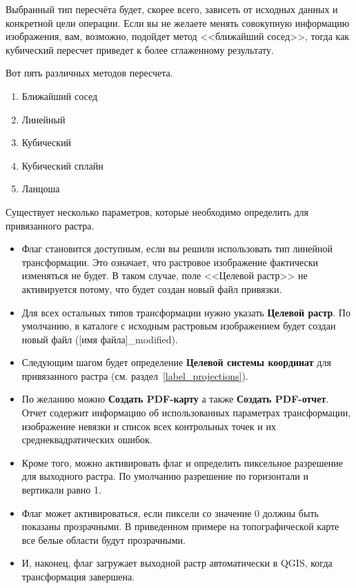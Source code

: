 Выбранный тип пересчёта будет, скорее всего, зависеть от исходных данных
и конкретной цели операции. Если вы не желаете менять совокупную
информацию изображения, вам, возможно, подойдет метод <<ближайший сосед>>,
тогда как кубический пересчет приведет к более сглаженному результату.

Вот пять различных методов пересчета.

\begin{enumerate}
\item Ближайший сосед
\item Линейный
\item Кубический
\item Кубический сплайн
\item Ланцоша
\end{enumerate}


Существует несколько параметров, которые необходимо определить для
привязанного растра.

\begin{itemize}[label=--]
\item Флаг  становится доступным, если
вы решили использовать тип линейной трансформации. Это
означает, что растровое изображение фактически изменяться не будет.
В таком случае, поле <<Целевой растр>> не активируется потому, что
будет создан новый файл привязки.
\item Для всех остальных типов трансформации нужно указать
\textbf{Целевой растр}. По умолчанию, в каталоге с исходным растровым
изображением будет создан новый файл ([имя файла]\_modified).
\item Следующим шагом будет определение \textbf{Целевой системы координат}
для привязанного растра (см. раздел~\ref{label_projections}).
\item По желанию можно \textbf{Создать PDF-карту} а также
\textbf{Создать PDF-отчет}. Отчет содержит информацию об использованных
параметрах трансформации, изображение невязки и список всех контрольных
точек и их среднеквадратических ошибок.
\item Кроме того, можно активировать флаг
 и определить пиксельное разрешение
для выходного растра. По умолчанию разрешение по горизонтали и вертикали
равно 1.
\item Флаг 
может активироваться, если пиксели со значение 0 должны быть показаны
прозрачными. В приведенном примере на топографической карте все белые
области будут прозрачными.
\item И, наконец, флаг  загружает
выходной растр автоматически в QGIS, когда трансформация завершена.
\end{itemize}

